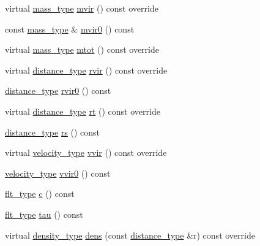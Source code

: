 \begin{DoxyCompactItemize}
virtual \hyperlink{namespaceIceBRG_a1be72ac4918a9b029f2eefa084213e35}{mass\+\_\+type} \hyperlink{classIceBRG_1_1tNFW__profile_aaa10d679c4d68b608213391ad207a9e8}{mvir} () const  override
\item 
const \hyperlink{namespaceIceBRG_a1be72ac4918a9b029f2eefa084213e35}{mass\+\_\+type} \& \hyperlink{classIceBRG_1_1tNFW__profile_a10d263889719dad83c3427418f500398}{mvir0} () const 
\item 
virtual \hyperlink{namespaceIceBRG_a1be72ac4918a9b029f2eefa084213e35}{mass\+\_\+type} \hyperlink{classIceBRG_1_1tNFW__profile_a8bb04b5e598b5d7ecb7d54c99383fdf6}{mtot} () const  override
\item 
virtual \hyperlink{namespaceIceBRG_a45499647eb87e24c10ab32c628711cec}{distance\+\_\+type} \hyperlink{classIceBRG_1_1tNFW__profile_a11c1a61f078c840a851e5a94c5b11fa9}{rvir} () const  override
\item 
\hyperlink{namespaceIceBRG_a45499647eb87e24c10ab32c628711cec}{distance\+\_\+type} \hyperlink{classIceBRG_1_1tNFW__profile_a06bacd5860bd6b3a7c7fe9806e882325}{rvir0} () const 
\item 
virtual \hyperlink{namespaceIceBRG_a45499647eb87e24c10ab32c628711cec}{distance\+\_\+type} \hyperlink{classIceBRG_1_1tNFW__profile_a5174a3f3cd9479b84369b7eef1f14a46}{rt} () const  override
\item 
\hyperlink{namespaceIceBRG_a45499647eb87e24c10ab32c628711cec}{distance\+\_\+type} \hyperlink{classIceBRG_1_1tNFW__profile_ae2002c071622afc42e9d71b2efbf5bcf}{rs} () const 
\item 
virtual \hyperlink{namespaceIceBRG_a34f8ef3b46f3408301e3c28197095eff}{velocity\+\_\+type} \hyperlink{classIceBRG_1_1tNFW__profile_a40db21729ec339b460b391b7a7b8e573}{vvir} () const  override
\item 
\hyperlink{namespaceIceBRG_a34f8ef3b46f3408301e3c28197095eff}{velocity\+\_\+type} \hyperlink{classIceBRG_1_1tNFW__profile_a072117f482aae948534b4c8ef02b0e66}{vvir0} () const 
\item 
\hyperlink{lib_2IceBRG__main_2common_8h_ad0f130a56eeb944d9ef2692ee881ecc4}{flt\+\_\+type} \hyperlink{classIceBRG_1_1tNFW__profile_a8a23013afebe3011a93e96b198996daa}{c} () const 
\item 
\hyperlink{lib_2IceBRG__main_2common_8h_ad0f130a56eeb944d9ef2692ee881ecc4}{flt\+\_\+type} \hyperlink{classIceBRG_1_1tNFW__profile_ae626c7f519332a795204a55ff843e514}{tau} () const 
\item 
virtual \hyperlink{namespaceIceBRG_a9f5e5cdd641bb4c06f7305dfb5ae0238}{density\+\_\+type} \hyperlink{classIceBRG_1_1tNFW__profile_a1ab9b1e6c9e677b51efa72980f7c59a6}{dens} (const \hyperlink{namespaceIceBRG_a45499647eb87e24c10ab32c628711cec}{distance\+\_\+type} \&r) const  override

\end{DoxyCompactItemize}
